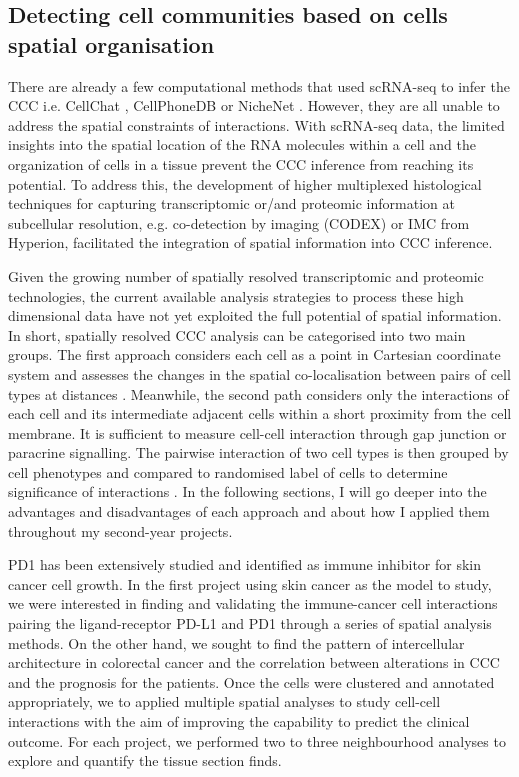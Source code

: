 \subsection{Detecting cell communities based on cells spatial organisation}
There are already a few computational methods that used scRNA-seq to infer the CCC i.e. CellChat \cite{jin2021CellChat}, CellPhoneDB \cite{efremova2020cellphonedb} or NicheNet \cite{browaeys2020nichenet}. However, they are all unable to address the spatial constraints of interactions. With scRNA-seq data, the limited insights into the spatial location of the RNA molecules within a cell and the organization of cells in a tissue prevent the CCC inference from reaching its potential. To address this, the development of higher multiplexed histological techniques for capturing transcriptomic or/and proteomic information at subcellular resolution, e.g. co-detection by imaging (CODEX) \cite{goltsev2018CODEX} or IMC from Hyperion, facilitated the integration of spatial information into CCC inference. 

Given the growing number of spatially resolved transcriptomic and proteomic technologies, the current available analysis strategies to process these high dimensional data have not yet exploited the full potential of spatial information. In short, spatially resolved CCC analysis can be categorised into two main groups. The first approach considers each cell as a point in Cartesian coordinate system and assesses the changes in the spatial co-localisation between pairs of cell types at distances \cite{arnol2019modeling,schurch2020coordinated}. Meanwhile, the second path considers only the interactions of each cell and its intermediate adjacent cells within a short proximity from the cell membrane. It is sufficient to measure cell-cell interaction through gap junction or paracrine signalling. The pairwise interaction of two cell types is then grouped by cell phenotypes and compared to randomised label of cells to determine significance of interactions  \cite{schapiro2017histocat}.  In the following sections, I will go deeper into the advantages and disadvantages of each approach and about how I applied them throughout my second-year projects.    

PD1 has been extensively studied and identified as immune inhibitor for skin cancer cell growth\cite{ishida1992induced,  tsai2014pd}. In the first project using skin cancer as the model to study, we were interested in finding and validating the immune-cancer cell interactions pairing the ligand-receptor PD-L1 and PD1 through a series of spatial analysis methods. On the other hand, we sought to find the pattern of intercellular architecture in colorectal cancer and the correlation between alterations in CCC and the prognosis for the patients. Once the cells were clustered and annotated appropriately, we to applied multiple spatial analyses to study cell-cell interactions with the aim of improving the capability to predict the clinical outcome. For each project, we performed two to three neighbourhood analyses to explore and quantify the tissue section finds.  

